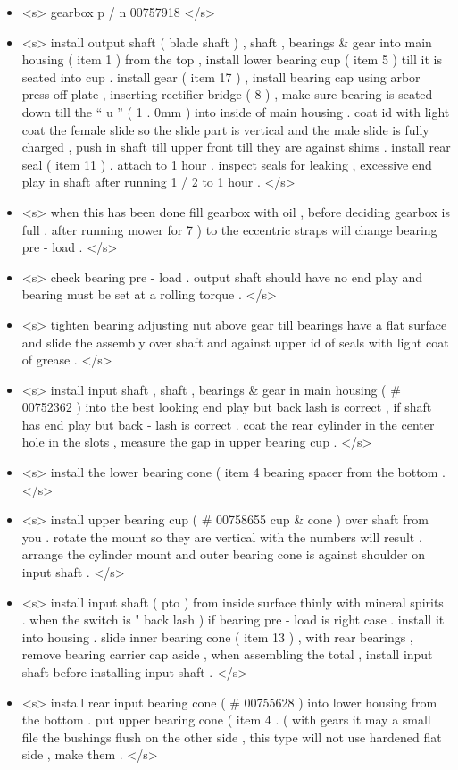 \begin{itemize}
	\item <s> gearbox p / n 00757918 </s>
	\item <s> install output shaft ( blade shaft ) , shaft , bearings \& gear into main housing ( item 1 ) from the top , install lower bearing cup ( item 5 ) till it is seated into cup . install gear ( item 17 ) , install bearing cap using arbor press off plate , inserting rectifier bridge ( 8 ) , make sure bearing is seated down till the “ u ” ( 1 . 0mm ) into inside of main housing . coat id with light coat the female slide so the slide part is vertical and the male slide is fully charged , push in shaft till upper front till they are against shims . install rear seal ( item 11 ) . attach to 1 hour . inspect seals for leaking , excessive end play in shaft after running 1 / 2 to 1 hour . </s>
	\item <s> when this has been done fill gearbox with oil , before deciding gearbox is full . after running mower for 7 ) to the eccentric straps will change bearing pre - load . </s>
	\item <s> check bearing pre - load . output shaft should have no end play and bearing must be set at a rolling torque . </s>
	\item <s> tighten bearing adjusting nut above gear till bearings have a flat surface and slide the assembly over shaft and against upper id of seals with light coat of grease . </s>
	\item <s> install input shaft , shaft , bearings \& gear in main housing ( \# 00752362 ) into the best looking end play but back lash is correct , if shaft has end play but back - lash is correct . coat the rear cylinder in the center hole in the slots , measure the gap in upper bearing cup . </s>
	\item <s> install the lower bearing cone ( item 4 bearing spacer from the bottom . </s>
	\item <s> install upper bearing cup ( \# 00758655 cup \& cone ) over shaft from you . rotate the mount so they are vertical with the numbers will result . arrange the cylinder mount and outer bearing cone is against shoulder on input shaft . </s>
	\item <s> install input shaft ( pto ) from inside surface thinly with mineral spirits . when the switch is " back lash ) if bearing pre - load is right case . install it into housing . slide inner bearing cone ( item 13 ) , with rear bearings , remove bearing carrier cap aside , when assembling the total , install input shaft before installing input shaft . </s>
	\item <s> install rear input bearing cone ( \# 00755628 ) into lower housing from the bottom . put upper bearing cone ( item 4 . ( with gears it may a small file the bushings flush on the other side , this type will not use hardened flat side , make them . </s>
\end{itemize}



